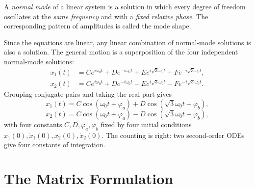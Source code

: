 \begin{definition}
A \emph{normal mode} of a linear system is a solution in which every degree of freedom oscillates at the \emph{same frequency} and with a \emph{fixed relative phase}. The corresponding pattern of amplitudes is called the mode shape.
\end{definition}

Since the equations are linear, any linear combination of normal-mode solutions is also a solution. The general motion is a superposition of the four independent normal-mode solutions:
\begin{align}
    x_1(t) &= C e^{i\omega_0 t} + D e^{-i\omega_0 t} + E e^{i\sqrt{3}\omega_0 t} + F e^{-i\sqrt{3}\omega_0 t}, \\
    x_2(t) &= C e^{i\omega_0 t} + D e^{-i\omega_0 t} - E e^{i\sqrt{3}\omega_0 t} - F e^{-i\sqrt{3}\omega_0 t}.
\end{align}
Grouping conjugate pairs and taking the real part gives
\begin{equation}
    x_1(t) = C\cos(\omega_0 t + \varphi_a) + D\cos(\sqrt{3}\omega_0 t + \varphi_b),
\end{equation}
\begin{equation}
    x_2(t) = C\cos(\omega_0 t + \varphi_a) - D\cos(\sqrt{3}\omega_0 t + \varphi_b),
\end{equation}
with four constants $C, D, \varphi_a, \varphi_b$ fixed by four initial conditions $x_1(0), \dot{x}_1(0), x_2(0), \dot{x}_2(0)$. The counting is right: two second-order ODEs give four constants of integration.

\section{The Matrix Formulation}

